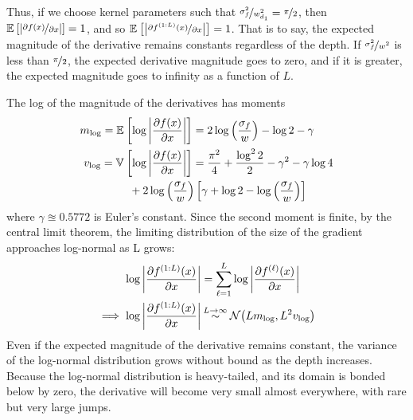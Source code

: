 \documentclass[twoside]{article}
\newcommand{\lengthscale}{w}
\newcommand{\layerindex}{\ell}
\begin{document}
Thus, if we choose kernel parameters such that $\nicefrac{\sigma^2_f}{\lengthscale_{d_1}^2} = \nicefrac{\pi}{2}$, then $\mathbb{E}_{} \left[ {\left| \nicefrac{\partial f(x)}{\partial x} \right|} \right] = 1$, and so $\mathbb{E}_{} \left[ {\left| \nicefrac{\partial f^{(1:L)}(x)}{\partial x} \right|} \right] = 1$.
That is to say, the expected magnitude of the derivative remains constants regardless of the depth.  If $\nicefrac{\sigma^2_f}{\lengthscale^2}$ is less than $\nicefrac{\pi}{2}$, the expected derivative magnitude goes to zero, and if it is greater, the expected magnitude goes to infinity as a function of $L$.  

The log of the magnitude of the derivatives has moments
\begin{align}
m_{\log} = \expectargs{}{\log \left| \frac{\partial f(x)}{\partial x} \right|} & = 2 \log \left( \frac{\sigma_f}{\lengthscale} \right) - \log2 - \gamma \\
v_{\log} = \varianceargs{}{\log \left| \frac{\partial f(x)}{\partial x} \right|} & = \frac{\pi^2}{4} + \frac{\log^2 2}{2}  - \gamma^2 - \gamma \log4 \nonumber \\
& \hspace{-2cm} + 2 \log\left(\frac{\sigma_f}{\lengthscale}\right) \left[ \gamma + \log2 - \log \left(\frac{\sigma_f}{\lengthscale}\right) \right]
\end{align}
where $\gamma \approxeq 0.5772$ is Euler's constant.  Since the second moment is finite, by the central limit theorem, the limiting distribution of the size of the gradient approaches log-normal as L grows:
\begin{align}
\log \left| \frac{\partial f^{(1:L)}(x)}{\partial x} \right| 
& = \sum_{\layerindex=1}^L \log \left| \frac{\partial f^{(\layerindex)}(x)}{\partial x} \right| \nonumber \\
 \implies
\log \left| \frac{\partial f^{(1:L)}(x)}{\partial x} \right| & \distas{L \rightarrow \infty} \Nt{ L m_{\log} }{L^2 v_{\log}}
\end{align}
%
Even if the expected magnitude of the derivative remains constant, the variance of the log-normal distribution grows without bound as the depth increases.  Because the log-normal distribution is heavy-tailed, and its domain is bonded below by zero, the derivative will become very small almost everywhere, with rare but very large jumps.  
\end{document}
